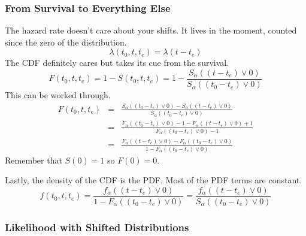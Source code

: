 \documentclass{article}
\begin{document}
\subsubsection{From Survival to Everything Else}

The hazard rate doesn't care about your shifts. It lives in the moment, counted since the zero of the distribution.
\begin{equation}
  \lambda(t_0, t, t_e) = \lambda(t-t_e)
\end{equation}
The CDF definitely cares but takes its cue from the survival.
\begin{equation}
 F(t_0,t,t_e) = 1-S(t_0,t,t_e) = 1-\frac{S_\alpha((t-t_e)\vee 0)}{S_\alpha((t_0-t_e)\vee 0)}
\end{equation}
This can be worked through.
\begin{eqnarray}
 F(t_0,t,t_e) & =& \frac{S_\alpha((t_0-t_e)\vee 0)-S_\alpha((t-t_e)\vee 0)}{S_\alpha((t_0-t_e)\vee 0)} \\
  & =& \frac{F_\alpha((t_0-t_e)\vee 0) - 1 -F_\alpha((t-t_e)\vee 0) + 1}{F_\alpha((t_0-t_e)\vee 0) - 1} \\
  & =& \frac{F_\alpha((t-t_e)\vee 0) - F_\alpha((t_0-t_e)\vee 0)}{1-F_\alpha((t_0-t_e)\vee 0)}
\end{eqnarray}
Remember that $S(0)=1$ so $F(0)=0$.

Lastly, the density of the CDF is the PDF. Most of the PDF terms are constant.
\begin{equation}
  f(t_0, t, t_e) = \frac{f_\alpha((t-t_e)\vee 0)}{1-F_\alpha((t_0-t_e)\vee 0)}=\frac{f_\alpha((t-t_e)\vee 0)}{S_\alpha((t_0-t_e)\vee 0)}
\end{equation}

\subsubsection{Likelihood with Shifted Distributions}
\end{document}
